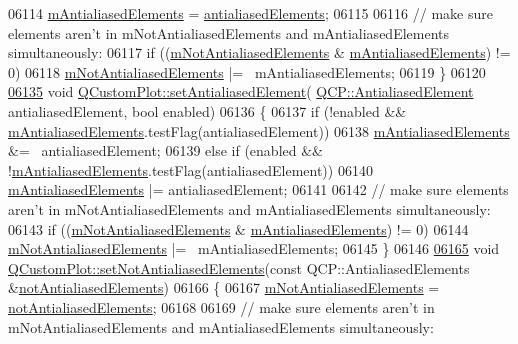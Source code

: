 \begin{DoxyCode}
06114   \hyperlink{a00116_a18feaee1080c45b74782bdbf0c252f89}{mAntialiasedElements} = \hyperlink{a00116_acc24388098ddb95f5a651cede3f34b99}{antialiasedElements};
06115   
06116   \textcolor{comment}{// make sure elements aren't in mNotAntialiasedElements and mAntialiasedElements simultaneously:}
06117   \textcolor{keywordflow}{if} ((\hyperlink{a00116_ac566e9d774e49dc4190346e02f31dcdf}{mNotAntialiasedElements} & \hyperlink{a00116_a18feaee1080c45b74782bdbf0c252f89}{mAntialiasedElements}) != 0)
06118     \hyperlink{a00116_ac566e9d774e49dc4190346e02f31dcdf}{mNotAntialiasedElements} |= ~mAntialiasedElements;
06119 \}
06120 
\hypertarget{a00115_source_l06135}{}\hyperlink{a00116_aeef813bcf7efab8e765f9f87ec454691}{06135} \textcolor{keywordtype}{void} \hyperlink{a00116_aeef813bcf7efab8e765f9f87ec454691}{QCustomPlot::setAntialiasedElement}(
      \hyperlink{a00143_ae55dbe315d41fe80f29ba88100843a0c}{QCP::AntialiasedElement} antialiasedElement, \textcolor{keywordtype}{bool} enabled)
06136 \{
06137   \textcolor{keywordflow}{if} (!enabled && \hyperlink{a00116_a18feaee1080c45b74782bdbf0c252f89}{mAntialiasedElements}.testFlag(antialiasedElement))
06138     \hyperlink{a00116_a18feaee1080c45b74782bdbf0c252f89}{mAntialiasedElements} &= ~antialiasedElement;
06139   \textcolor{keywordflow}{else} \textcolor{keywordflow}{if} (enabled && !\hyperlink{a00116_a18feaee1080c45b74782bdbf0c252f89}{mAntialiasedElements}.testFlag(antialiasedElement))
06140     \hyperlink{a00116_a18feaee1080c45b74782bdbf0c252f89}{mAntialiasedElements} |= antialiasedElement;
06141   
06142   \textcolor{comment}{// make sure elements aren't in mNotAntialiasedElements and mAntialiasedElements simultaneously:}
06143   \textcolor{keywordflow}{if} ((\hyperlink{a00116_ac566e9d774e49dc4190346e02f31dcdf}{mNotAntialiasedElements} & \hyperlink{a00116_a18feaee1080c45b74782bdbf0c252f89}{mAntialiasedElements}) != 0)
06144     \hyperlink{a00116_ac566e9d774e49dc4190346e02f31dcdf}{mNotAntialiasedElements} |= ~mAntialiasedElements;
06145 \}
06146 
\hypertarget{a00115_source_l06165}{}\hyperlink{a00116_ae10d685b5eabea2999fb8775ca173c24}{06165} \textcolor{keywordtype}{void} \hyperlink{a00116_ae10d685b5eabea2999fb8775ca173c24}{QCustomPlot::setNotAntialiasedElements}(\textcolor{keyword}{const} 
      QCP::AntialiasedElements &\hyperlink{a00116_ad611ed86732d07774545f5bd4b7f18b7}{notAntialiasedElements})
06166 \{
06167   \hyperlink{a00116_ac566e9d774e49dc4190346e02f31dcdf}{mNotAntialiasedElements} = \hyperlink{a00116_ad611ed86732d07774545f5bd4b7f18b7}{notAntialiasedElements};
06168   
06169   \textcolor{comment}{// make sure elements aren't in mNotAntialiasedElements and mAntialiasedElements simultaneously:}

\end{DoxyCode}
